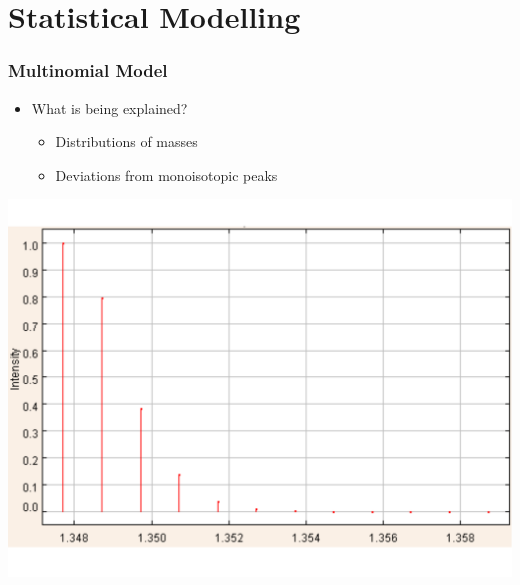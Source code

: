 \documentclass[xetex]{beamer}
\begin{document}
\section[Model]{Statistical Modelling}
	\begin{frame}\frametitle{Multinomial Model}
		    
		\begin{itemize}
			\item What is being explained?
			\begin{itemize}
				\item Distributions of masses 
				\item Deviations from monoisotopic peaks
			\end{itemize}
		\end{itemize}

		\begin{center}
			\includegraphics[height=.5\textheight, keepaspectratio]{./picts/realMassDistribution.pdf}
		\end{center}
	\end{frame}	
\end{document}
